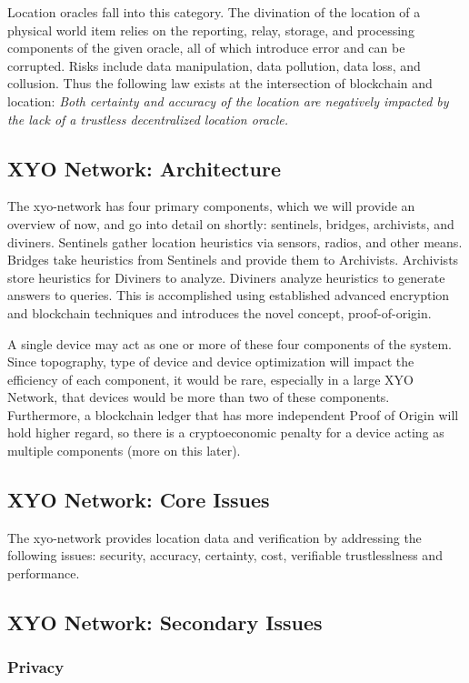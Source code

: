 \documentclass{article}
\begin{document}
Location oracles fall into this category. The divination of the location of a physical world item relies on the reporting, relay, storage, and processing components of the given oracle, all of which introduce error and can be corrupted. Risks include data manipulation, data pollution, data loss, and collusion. Thus the following law exists at the intersection of blockchain and location: \textit{Both \gls{certainty} and \gls{accuracy} of the location are negatively impacted by the lack of a trustless decentralized location oracle.}

\subsection {XYO Network: Architecture}
The \Gls{xyo-network} has four primary components, which we will provide an overview of now, and go into detail on shortly: \Glspl{sentinel}, \Glspl{bridge}, \Glspl{archivist}, and \Glspl{diviner}. Sentinels gather location \glspl{heuristic} via sensors, radios, and other means. Bridges take heuristics from Sentinels and provide them to Archivists. Archivists store heuristics for Diviners to analyze. Diviners analyze heuristics to generate answers to queries. This is accomplished using established advanced encryption and blockchain techniques and introduces the novel concept, \Gls{proof-of-origin}.

A single device may act as one or more of these four components of the system. Since topography, type of device and device optimization will impact the efficiency of each component, it would be rare, especially in a large XYO Network, that devices would be more than two of these components. Furthermore, a blockchain ledger that has more independent Proof of Origin will hold higher regard, so there is a cryptoeconomic penalty for a device acting as multiple components (more on this later).

\subsection {XYO Network: Core Issues}
The \Gls{xyo-network} provides location data and verification by addressing the following issues: security, accuracy, \gls{certainty}, cost, verifiable trustlesslness and performance.

\subsection {XYO Network: Secondary Issues}
\subsubsection{Privacy}
\end{document}
